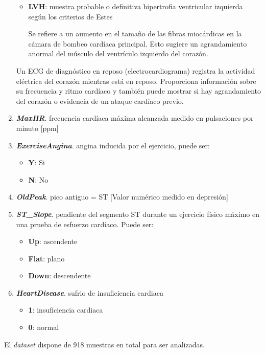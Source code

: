 \documentclass[12pt, letterpaper]{article}
\begin{document}
\begin{enumerate}
{\begin{itemize}
{        }
        \item{\textbf{LVH}: muestra probable o definitiva hipertrofia ventricular 
        izquierda según los criterios de Estes
       
        Se refiere a un aumento en el tamaño de las fibras miocárdicas en la cámara de bombeo 
        cardíaca principal.
        Esto sugiere un agrandamiento anormal del músculo del ventrículo izquierdo del corazón.
        \cite{LVH}
        }
    \end{itemize}

    Un ECG de diagnóstico en reposo (electrocardiograma) registra la actividad eléctrica 
    del corazón mientras está en reposo. Proporciona información sobre su frecuencia y 
    ritmo cardíaco y también puede mostrar si hay agrandamiento del corazón o 
    evidencia de un ataque cardíaco previo. \cite{electrocardiograma}
    } 
    \item{\textbf{\textit{MaxHR}}. frecuencia cardíaca máxima alcanzada
    medido en pulsaciones por minuto [ppm]}
    \item{\textbf{\textit{ExerciseAngina}}. angina inducida por el ejercicio, puede ser:
    \begin{itemize}
        \item{\textbf{Y}}: Si
        \item{\textbf{N}}: No
    \end{itemize}
    }
    \item{\textbf{\textit{OldPeak}}. pico antiguo = ST [Valor numérico medido en depresión]}
    \item{\textbf{\textit{ST\_Slope}}. pendiente del segmento ST 
    durante un ejercicio físico máximo en una prueba de 
    esfuerzo cardíaco. Puede ser:
    \begin{itemize}
        \item{\textbf{Up}}: ascendente
        \item{\textbf{Flat}}: plano
        \item{\textbf{Down}}: descendente
    \end{itemize}
    }
    \item{\textbf{\textit{HeartDisease}}. sufrio de insuficiencia cardiaca
    \begin{itemize}
        \item{\textbf{1}}: insuficiencia cardiaca
        \item{\textbf{0}}: normal
    \end{itemize}
    }
\end{enumerate}
El \textit{dataset} dispone de 918 muestras en total para ser analizadas.
\end{document}
